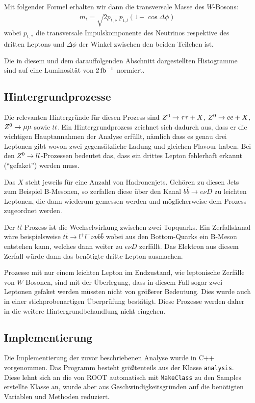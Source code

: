 Mit folgender Formel erhalten wir dann die transversale Masse des $W$-Bosons: 
\begin{align}
  m_t = \sqrt{2 p_{t,\nu}\; p_{t,l} (1 - \cos{\Delta\phi})}
  \label{eqn:trans}
\end{align}
wobei $p_{t,*}$ die transversale Impulskomponente des Neutrinos respektive des
dritten Leptons und $\Delta\phi$ der Winkel zwischen den beiden Teilchen ist.

Die in diesem und dem darauffolgenden Abschnitt dargestellten Histogramme sind
auf eine Luminosität von $\unit[2]{fb^{-1}}$ normiert.

\subsection{Hintergrundprozesse}
Die relevanten Hintergründe für diesen Prozess sind $Z^0\to\tau\tau + X$, $Z^0\to
e e + X$, $Z^0\to\mu\mu$ sowie $t\bar{t}$. Ein Hintergrundprozess zeichnet sich
dadurch aus, dass er die wichtigen Hauptannahmen der Analyse erfüllt, nämlich
dass es genau drei Leptonen gibt wovon zwei gegensätzliche Ladung und gleichen
Flavour haben. Bei den $Z^0\to ll$-Prozessen bedeutet das, dass ein drittes
Lepton fehlerhaft erkannt ("`gefaket"') werden muss.

Das $X$ steht jeweils für eine Anzahl von Hadronenjets. Gehören zu diesen Jets
zum Beispiel B-Mesonen, so zerfallen diese über den Kanal $b\bar{b}\to e\nu D$
zu leichten Leptonen, die dann wiederum gemessen werden und möglicherweise dem
Prozess zugeordnet werden.

Der $t\bar{t}$-Prozess ist die Wechselwirkung zwischen zwei Topquarks. Ein
Zerfallskanal wäre beispielsweise $t\bar t\to l^+l^-\nu\nu b\bar{b}$ wobei aus
den Bottom-Quarks ein B-Meson entstehen kann, welches dann weiter zu $e\nu D$
zerfällt. Das Elektron aus diesem Zerfall würde dann das benötigte dritte Lepton
ausmachen.

Prozesse mit nur einem leichten Lepton im Endzustand, wie leptonische Zerfälle
von $W$-Bosonen, sind mit der Überlegung, dass in diesem Fall sogar zwei
Leptonen gefaket werden müssten nicht von größerer Bedeutung. Dies wurde auch in
einer stichprobenartigen Überprüfung bestätigt. Diese Prozesse werden daher in
die weitere Hintergrundbehandlung nicht eingehen.

\subsection{Implementierung}
Die Implementierung der zuvor beschriebenen Analyse wurde in C++ vorgenommen.
Das Programm besteht größtenteils aus der Klasse \lstinline!analysis!. Diese
lehnt sich an die von ROOT automatisch mit \lstinline!MakeClass! zu den Samples
erstellte Klasse an, wurde aber aus Geschwindigkeitsgründen auf die benötigten
Variablen und Methoden reduziert.

